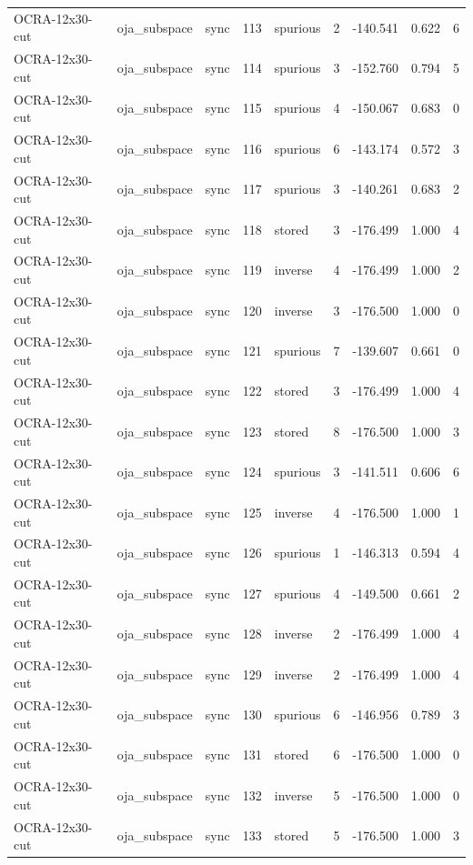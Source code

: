 \begin{tabular}{lllrlrrrr}
OCRA-12x30-cut & oja\_subspace & sync & 113 & spurious & 2 & -140.541 & 0.622 & 6 \\
OCRA-12x30-cut & oja\_subspace & sync & 114 & spurious & 3 & -152.760 & 0.794 & 5 \\
OCRA-12x30-cut & oja\_subspace & sync & 115 & spurious & 4 & -150.067 & 0.683 & 0 \\
OCRA-12x30-cut & oja\_subspace & sync & 116 & spurious & 6 & -143.174 & 0.572 & 3 \\
OCRA-12x30-cut & oja\_subspace & sync & 117 & spurious & 3 & -140.261 & 0.683 & 2 \\
OCRA-12x30-cut & oja\_subspace & sync & 118 & stored & 3 & -176.499 & 1.000 & 4 \\
OCRA-12x30-cut & oja\_subspace & sync & 119 & inverse & 4 & -176.499 & 1.000 & 2 \\
OCRA-12x30-cut & oja\_subspace & sync & 120 & inverse & 3 & -176.500 & 1.000 & 0 \\
OCRA-12x30-cut & oja\_subspace & sync & 121 & spurious & 7 & -139.607 & 0.661 & 0 \\
OCRA-12x30-cut & oja\_subspace & sync & 122 & stored & 3 & -176.499 & 1.000 & 4 \\
OCRA-12x30-cut & oja\_subspace & sync & 123 & stored & 8 & -176.500 & 1.000 & 3 \\
OCRA-12x30-cut & oja\_subspace & sync & 124 & spurious & 3 & -141.511 & 0.606 & 6 \\
OCRA-12x30-cut & oja\_subspace & sync & 125 & inverse & 4 & -176.500 & 1.000 & 1 \\
OCRA-12x30-cut & oja\_subspace & sync & 126 & spurious & 1 & -146.313 & 0.594 & 4 \\
OCRA-12x30-cut & oja\_subspace & sync & 127 & spurious & 4 & -149.500 & 0.661 & 2 \\
OCRA-12x30-cut & oja\_subspace & sync & 128 & inverse & 2 & -176.499 & 1.000 & 4 \\
OCRA-12x30-cut & oja\_subspace & sync & 129 & inverse & 2 & -176.499 & 1.000 & 4 \\
OCRA-12x30-cut & oja\_subspace & sync & 130 & spurious & 6 & -146.956 & 0.789 & 3 \\
OCRA-12x30-cut & oja\_subspace & sync & 131 & stored & 6 & -176.500 & 1.000 & 0 \\
OCRA-12x30-cut & oja\_subspace & sync & 132 & inverse & 5 & -176.500 & 1.000 & 0 \\
OCRA-12x30-cut & oja\_subspace & sync & 133 & stored & 5 & -176.500 & 1.000 & 3 \\

\end{tabular}
